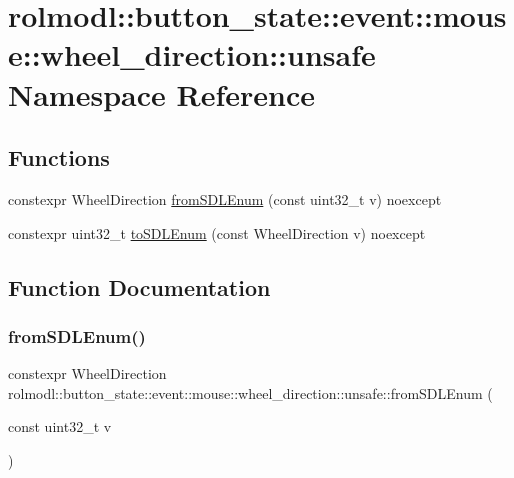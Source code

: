\hypertarget{namespacerolmodl_1_1button__state_1_1event_1_1mouse_1_1wheel__direction_1_1unsafe}{}\section{rolmodl\+::button\+\_\+state\+::event\+::mouse\+::wheel\+\_\+direction\+::unsafe Namespace Reference}
\label{namespacerolmodl_1_1button__state_1_1event_1_1mouse_1_1wheel__direction_1_1unsafe}
\subsection*{Functions}
\begin{DoxyCompactItemize}
\item 
constexpr Wheel\+Direction \mbox{\hyperlink{namespacerolmodl_1_1button__state_1_1event_1_1mouse_1_1wheel__direction_1_1unsafe_aa03ffdd011cf5b26f49dc2b5cffcc807}{from\+S\+D\+L\+Enum}} (const uint32\+\_\+t v) noexcept
\item 
constexpr uint32\+\_\+t \mbox{\hyperlink{namespacerolmodl_1_1button__state_1_1event_1_1mouse_1_1wheel__direction_1_1unsafe_aceaf624fe5bd6a8ac0206a6aac87a90d}{to\+S\+D\+L\+Enum}} (const Wheel\+Direction v) noexcept
\end{DoxyCompactItemize}


\subsection{Function Documentation}
\mbox{\label{namespacerolmodl_1_1button__state_1_1event_1_1mouse_1_1wheel__direction_1_1unsafe_aa03ffdd011cf5b26f49dc2b5cffcc807}} 
\subsubsection{\texorpdfstring{fromSDLEnum()}{fromSDLEnum()}}
{\footnotesize\ttfamily constexpr Wheel\+Direction rolmodl\+::button\+\_\+state\+::event\+::mouse\+::wheel\+\_\+direction\+::unsafe\+::from\+S\+D\+L\+Enum (\begin{DoxyParamCaption}\item[{const uint32\+\_\+t}]{v }\end{DoxyParamCaption})\hspace{0.3cm}{\ttfamily [noexcept]}}



